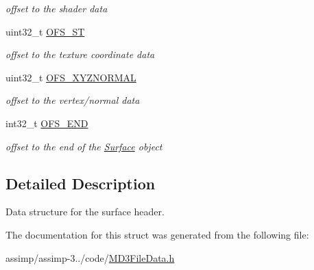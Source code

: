 \begin{DoxyCompactItemize}
\begin{DoxyCompactList}\small\item\em offset to the shader data \end{DoxyCompactList}\item 
\hypertarget{struct_assimp_1_1_m_d3_1_1_surface_aa37c7e3ad98152a1fdf5c3fa4c1ff442}{uint32\+\_\+t \hyperlink{struct_assimp_1_1_m_d3_1_1_surface_aa37c7e3ad98152a1fdf5c3fa4c1ff442}{O\+F\+S\+\_\+\+S\+T}}\label{struct_assimp_1_1_m_d3_1_1_surface_aa37c7e3ad98152a1fdf5c3fa4c1ff442}

\begin{DoxyCompactList}\small\item\em offset to the texture coordinate data \end{DoxyCompactList}\item 
\hypertarget{struct_assimp_1_1_m_d3_1_1_surface_a9acbb77ec2c4be205eb6a11ef1d944d4}{uint32\+\_\+t \hyperlink{struct_assimp_1_1_m_d3_1_1_surface_a9acbb77ec2c4be205eb6a11ef1d944d4}{O\+F\+S\+\_\+\+X\+Y\+Z\+N\+O\+R\+M\+A\+L}}\label{struct_assimp_1_1_m_d3_1_1_surface_a9acbb77ec2c4be205eb6a11ef1d944d4}

\begin{DoxyCompactList}\small\item\em offset to the vertex/normal data \end{DoxyCompactList}\item 
\hypertarget{struct_assimp_1_1_m_d3_1_1_surface_a98af029919da3b7971d057f533a530e0}{int32\+\_\+t \hyperlink{struct_assimp_1_1_m_d3_1_1_surface_a98af029919da3b7971d057f533a530e0}{O\+F\+S\+\_\+\+E\+N\+D}}\label{struct_assimp_1_1_m_d3_1_1_surface_a98af029919da3b7971d057f533a530e0}

\begin{DoxyCompactList}\small\item\em offset to the end of the \hyperlink{struct_assimp_1_1_m_d3_1_1_surface}{Surface} object \end{DoxyCompactList}\end{DoxyCompactItemize}


\subsection{Detailed Description}
Data structure for the surface header. 

The documentation for this struct was generated from the following file\+:\begin{DoxyCompactItemize}
\item 
assimp/assimp-\/3../code/\hyperlink{_m_d3_file_data_8h}{M\+D3\+File\+Data.\+h}\end{DoxyCompactItemize}
